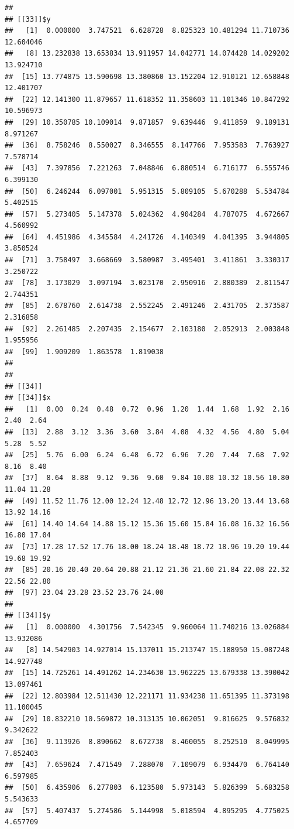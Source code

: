 \documentclass[
  ignorenonframetext,
]{beamer}
\begin{document}
\begin{frame}[fragile]{}
\begin{verbatim}
## 
## [[33]]$y
##   [1]  0.000000  3.747521  6.628728  8.825323 10.481294 11.710736 12.604046
##   [8] 13.232838 13.653834 13.911957 14.042771 14.074428 14.029202 13.924710
##  [15] 13.774875 13.590698 13.380860 13.152204 12.910121 12.658848 12.401707
##  [22] 12.141300 11.879657 11.618352 11.358603 11.101346 10.847292 10.596973
##  [29] 10.350785 10.109014  9.871857  9.639446  9.411859  9.189131  8.971267
##  [36]  8.758246  8.550027  8.346555  8.147766  7.953583  7.763927  7.578714
##  [43]  7.397856  7.221263  7.048846  6.880514  6.716177  6.555746  6.399130
##  [50]  6.246244  6.097001  5.951315  5.809105  5.670288  5.534784  5.402515
##  [57]  5.273405  5.147378  5.024362  4.904284  4.787075  4.672667  4.560992
##  [64]  4.451986  4.345584  4.241726  4.140349  4.041395  3.944805  3.850524
##  [71]  3.758497  3.668669  3.580987  3.495401  3.411861  3.330317  3.250722
##  [78]  3.173029  3.097194  3.023170  2.950916  2.880389  2.811547  2.744351
##  [85]  2.678760  2.614738  2.552245  2.491246  2.431705  2.373587  2.316858
##  [92]  2.261485  2.207435  2.154677  2.103180  2.052913  2.003848  1.955956
##  [99]  1.909209  1.863578  1.819038
## 
## 
## [[34]]
## [[34]]$x
##   [1]  0.00  0.24  0.48  0.72  0.96  1.20  1.44  1.68  1.92  2.16  2.40  2.64
##  [13]  2.88  3.12  3.36  3.60  3.84  4.08  4.32  4.56  4.80  5.04  5.28  5.52
##  [25]  5.76  6.00  6.24  6.48  6.72  6.96  7.20  7.44  7.68  7.92  8.16  8.40
##  [37]  8.64  8.88  9.12  9.36  9.60  9.84 10.08 10.32 10.56 10.80 11.04 11.28
##  [49] 11.52 11.76 12.00 12.24 12.48 12.72 12.96 13.20 13.44 13.68 13.92 14.16
##  [61] 14.40 14.64 14.88 15.12 15.36 15.60 15.84 16.08 16.32 16.56 16.80 17.04
##  [73] 17.28 17.52 17.76 18.00 18.24 18.48 18.72 18.96 19.20 19.44 19.68 19.92
##  [85] 20.16 20.40 20.64 20.88 21.12 21.36 21.60 21.84 22.08 22.32 22.56 22.80
##  [97] 23.04 23.28 23.52 23.76 24.00
## 
## [[34]]$y
##   [1]  0.000000  4.301756  7.542345  9.960064 11.740216 13.026884 13.932086
##   [8] 14.542903 14.927014 15.137011 15.213747 15.188950 15.087248 14.927748
##  [15] 14.725261 14.491262 14.234630 13.962225 13.679338 13.390042 13.097461
##  [22] 12.803984 12.511430 12.221171 11.934238 11.651395 11.373198 11.100045
##  [29] 10.832210 10.569872 10.313135 10.062051  9.816625  9.576832  9.342622
##  [36]  9.113926  8.890662  8.672738  8.460055  8.252510  8.049995  7.852403
##  [43]  7.659624  7.471549  7.288070  7.109079  6.934470  6.764140  6.597985
##  [50]  6.435906  6.277803  6.123580  5.973143  5.826399  5.683258  5.543633
##  [57]  5.407437  5.274586  5.144998  5.018594  4.895295  4.775025  4.657709

\end{verbatim}
\end{frame}
\end{document}
